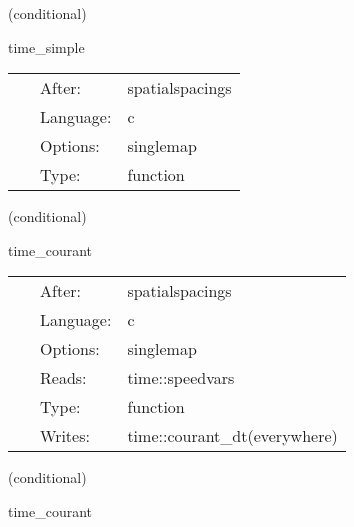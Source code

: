 \vspace{5mm}

   (conditional) 

\hspace{5mm} time\_simple 

\hspace{5mm}{\it set timestep based on courant condition (courant\_static) } 


\hspace{5mm}

 \begin{tabular*}{160mm}{cll} 
~ & After:  & spatialspacings \\ 
~ & Language:  & c \\ 
~ & Options:  & singlemap \\ 
~ & Type:  & function \\ 
\end{tabular*} 


\vspace{5mm}

   (conditional) 

\hspace{5mm} time\_courant 

\hspace{5mm}{\it set timestep based on courant condition (courant\_speed) } 


\hspace{5mm}

 \begin{tabular*}{160mm}{cll} 
~ & After:  & spatialspacings \\ 
~ & Language:  & c \\ 
~ & Options:  & singlemap \\ 
~ & Reads:  & time::speedvars \\ 
~ & Type:  & function \\ 
~ & Writes:  & time::courant\_dt(everywhere) \\ 
\end{tabular*} 


\vspace{5mm}

   (conditional) 

\hspace{5mm} time\_courant 

\hspace{5mm}{\it reset timestep each iteration } 


\hspace{5mm}

